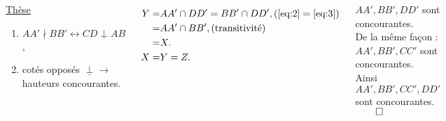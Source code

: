 \documentclass[10pt]{beamer}
\def \orthog {\underline{\perp}}
\begin{document}
{\begin{columns}[t]
\begin{tcolorbox}[basic]
				    \underline{Thèse} 
				    \renewcommand{\theenumi}{\alph{enumi})}
				    \begin{enumerate}
				    \item $AA'\nmid BB' \leftrightarrow CD \orthog AB$,
				    \item cotés opposés $\orthog \rightarrow$ hauteurs concourantes.
				    \end{enumerate}
				    \end{tcolorbox}
		
		
		\flushleft
		 
		\begin{align*}	
			    Y =& AA' \cap DD' = BB' \cap DD', (\ref{eq:2}=\ref{eq:3}) \\
			      =& AA' \cap BB', \text{(transitivité)}\\
			      =& X.\\
			    X =& Y = Z. 	      
		\end{align*} 
		
		\bigskip
		
		$AA',BB',DD'$ sont concourantes. \\ \medskip
		De la même façon : \\ \medskip
		$AA',BB',CC'$ sont concourantes. \\ \bigskip
		Ainsi $AA',BB',CC',DD'$ sont concourantes. \hfill $\qed$   
	   \end{columns}
    
    
    
  }
  
\end{document}
